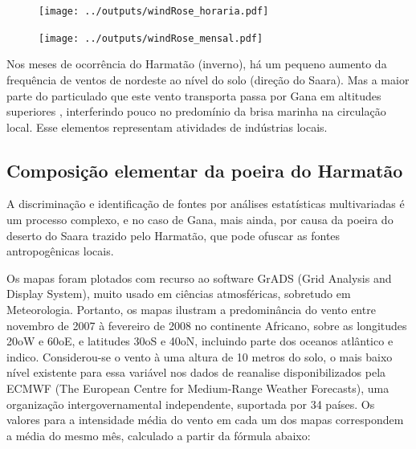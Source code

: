 \begin{figure}[H]
  \centering
  \texttt{[image: ../outputs/windRose\_horaria.pdf]}
  \caption{ \citep{carslaw2012} \label{fig:windRose_horaria}}%
\end{figure}

\begin{figure}[H]
  \centering
  \texttt{[image: ../outputs/windRose\_mensal.pdf]}
  \caption{ \citep{carslaw2012} \label{fig:windRose_mensal}}
\end{figure}

Nos meses de ocorrência do Harmatão (inverno), há um pequeno aumento da frequência de ventos de nordeste ao nível do solo (direção do Saara). Mas a maior parte do particulado que este vento transporta passa por Gana 
em altitudes superiores \citep{breuning2005}, interferindo pouco no predomínio da brisa marinha na circulação local.%
%
Esse elementos representam atividades de indústrias locais. 

\newpage
\subsection{Composição elementar da poeira do Harmatão}

A discriminação e identificação de fontes por análises estatísticas 
multivariadas é um processo complexo, e no caso de Gana, mais ainda, 
por causa da poeira do deserto do Saara trazido pelo Harmatão, que pode 
ofuscar as fontes antropogênicas locais.

Os mapas foram plotados com recurso ao software GrADS (Grid Analysis and Display System), muito usado em ciências atmosféricas, sobretudo em Meteorologia. Portanto, os mapas ilustram a predominância do vento entre novembro de 2007 à fevereiro de 2008 no continente Africano, sobre as longitudes 20oW e 60oE, e latitudes 30oS e 40oN, incluindo parte dos oceanos atlântico e indico. Considerou-se o vento à uma altura de 10 metros do solo, o mais baixo nível existente para essa variável nos dados de reanalise disponibilizados pela ECMWF (The European Centre for Medium-Range Weather Forecasts), uma organização intergovernamental independente, suportada por 34 países.
Os valores para a intensidade média do vento em cada um dos mapas correspondem a média do mesmo mês, calculado a partir da fórmula abaixo:

